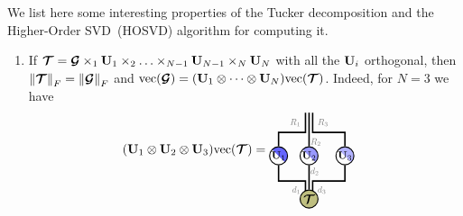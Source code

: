 \begin{remark}\label{rem:tuckers}
We list here some interesting properties of the Tucker decomposition and the Higher-Order SVD~(HOSVD) algorithm for computing it.
\begin{enumerate}

\item  If  $\Tt = \Gt\ttm{1}\Ub_1\ttm{2}\dots\ttm{N-1}\Ub_{N-1}\ttm{N}\Ub_N$ with all the $\mathbf{U}_i$ orthogonal, then $\left\lVert\bm{\mathcal{T}}\right\rVert_F = \left\lVert\bm{\mathcal{G}}\right\rVert_F$ and $\mathrm{vec}(\bm{\mathcal{G}}) = (\mathbf{U}_1\otimes\cdots\otimes\mathbf{U}_N)\mathrm{vec}(\bm{\mathcal{T}})$. 
Indeed, for $N=3$ we have
\begin{align*}
(\Ub_1\kron\Ub_2\kron\Ub_3)\vectorize(\Tt) &= 
\begin{tikzpicture}[baseline=-0.5ex]
    \tikzset{tensor/.style = {minimum size = 0.5cm,shape = circle,thick,draw=black,inner sep = 0pt}, edge/.style = {thick,line width=.4mm},every loop/.style={}}
    \def\x{0}
    \def\y{0.5}   
    \node[tensor, path picture={
    \fill[fill=blue!60!white](path picture bounding box.south east)
        -- 
    (path picture bounding box.north west) --
    (path picture bounding box.north east) -- cycle;
    }, shift={(\x-0.85,\y-0.65)}] (U_1) {\scalebox{0.85}{$\Ub_1$}};
    \node[tensor, path picture={
    \fill[fill=blue!40!white](path picture bounding box.south east)
        -- 
    (path picture bounding box.north west) --
    (path picture bounding box.north east) -- cycle;
    }, shift={(\x,\y-0.65)}] (U_2) {\scalebox{0.85}{$\Ub_2$}};
    \node[tensor, path picture={
    \fill[fill=blue!30!white](path picture bounding box.south east)
        -- 
    (path picture bounding box.north west) --
    (path picture bounding box.north east) -- cycle;
    }, shift={(\x+1,\y-0.65)}] (U_3) {\scalebox{0.85}{$\Ub_3$}};
    \draw[edge] (U_1) -- (\x-0.85,\y-1.35) -- (\x-0.1,\y-1.35) -- (\x-0.1,\y-1.85) node [midway, left] {\scalebox{0.7}{\dimcolor{$d_1$}}};
    \draw[edge] (U_2) -- (\x,\y+0.55) node [very near start, right=-0.1cm] {\scalebox{0.7}{\dimcolor{$R_2$}}};
    \draw[edge] (U_3) -- (\x+1,\y-1.35) -- (\x+0.1,\y-1.35) -- (\x+0.1, \y-1.85) node [midway, right] {\scalebox{0.7}{\dimcolor{$d_3$}}};
    \draw[edge](U_1) -- (\x-0.85,\y) -- (\x-0.1,\y) -- (\x-0.1,\y+0.55)node [midway, left] {\scalebox{0.7}{\dimcolor{$R_1$}}};
    \draw[edge](U_3) -- (\x+1,\y) -- (\x+0.1,\y) -- (\x+0.1,\y+0.55)node [midway, right] {\scalebox{0.7}{\dimcolor{$R_3$}}};
    \node[tensor,fill=green!50!red!50!white](T) at (\x,\y-1.85) {$\Tt$};
    \draw[edge](U_2)--(T)node [near start, right=-0.1cm] {\scalebox{0.7}{\dimcolor{$d_2$}}};
\end{tikzpicture}

\end{align*}
\end{enumerate}
\end{remark}
